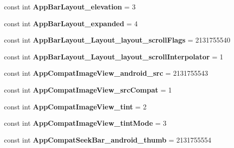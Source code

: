 \begin{DoxyCompactItemize}
const int {\bfseries App\+Bar\+Layout\+\_\+elevation} = 3
\item 
\mbox{\label{classst_delivery_1_1_resource_1_1_styleable_a170e8726e10739fcb6e22c691972847e}} 
const int {\bfseries App\+Bar\+Layout\+\_\+expanded} = 4
\item 
\mbox{\label{classst_delivery_1_1_resource_1_1_styleable_aff027254f83509e11a68579ec9692ae4}} 
const int {\bfseries App\+Bar\+Layout\+\_\+\+Layout\+\_\+layout\+\_\+scroll\+Flags} = 2131755540
\item 
\mbox{\label{classst_delivery_1_1_resource_1_1_styleable_a1fee8b0e619211f9a92653e52746af0d}} 
const int {\bfseries App\+Bar\+Layout\+\_\+\+Layout\+\_\+layout\+\_\+scroll\+Interpolator} = 1
\item 
\mbox{\label{classst_delivery_1_1_resource_1_1_styleable_a86ab438efcc77e8d85b08554fc471b4c}} 
const int {\bfseries App\+Compat\+Image\+View\+\_\+android\+\_\+src} = 2131755543
\item 
\mbox{\label{classst_delivery_1_1_resource_1_1_styleable_a25865b3b40a94c53d09cd3985644d252}} 
const int {\bfseries App\+Compat\+Image\+View\+\_\+src\+Compat} = 1
\item 
\mbox{\label{classst_delivery_1_1_resource_1_1_styleable_a8c09e14f6fffc654466d01c16b967afc}} 
const int {\bfseries App\+Compat\+Image\+View\+\_\+tint} = 2
\item 
\mbox{\label{classst_delivery_1_1_resource_1_1_styleable_a2727038746645f52ff7e93f44c038843}} 
const int {\bfseries App\+Compat\+Image\+View\+\_\+tint\+Mode} = 3
\item 
\mbox{\label{classst_delivery_1_1_resource_1_1_styleable_ab4dbda3908eed581b6386a3c547b4a22}} 
const int {\bfseries App\+Compat\+Seek\+Bar\+\_\+android\+\_\+thumb} = 2131755554
\item 
\mbox{\label{classst_delivery_1_1_resource_1_1_styleable_af0bb59929d007d45a441aeb76efe76f3}} 

\end{DoxyCompactItemize}
